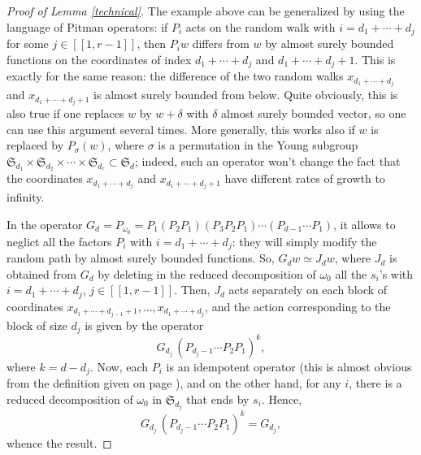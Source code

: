 \documentclass[smallextended,nospthms]{svjour3}
\theoremstyle{remark}
\newcommand{\sym}{\mathfrak{S}}
\newcommand{\lle}{\left[\!\left[}
\newcommand{\rre}{\right]\!\right]}
\begin{document}
\begin{proof}[Proof of Lemma \ref{technical}]
The example above can be generalized by using the language of Pitman operators: if $P_{i}$ acts on the random walk with $i=d_{1}+\cdots+d_{j}$ for some $j \in \lle 1,r-1\rre$, then $P_{i}w$ differs from $w$ by almost surely bounded functions on the coordinates of index $d_{1}+\cdots+d_{j}$ and $d_{1}+\cdots+d_{j}+1$. This is exactly for the same reason: the difference of the two random walks $x_{d_{1}+\cdots+d_{j}}$ and $x_{d_{1}+\cdots+d_{j}+1}$ is almost surely bounded from below. Quite obviously, this is also true if one replaces $w$ by $w+\delta$ with $\delta$ almost surely bounded vector, so one can use this argument several times. More generally, this works also if $w$ is replaced by $P_{\sigma}(w)$, where $\sigma$ is a permutation in the Young subgroup $\sym_{d_{1}}\times \sym_{d_{2}}\times \cdots \times \sym_{d_{r}} \subset \sym_{d}$; indeed, such an operator won't change the fact that the coordinates $x_{d_{1}+\cdots+d_{j}}$ and $x_{d_{1}+\cdots+d_{j}+1}$ have different rates of growth to infinity. \bigskip

In the operator $G_{d}=P_{\omega_{0}}=P_{1}(P_{2}P_{1})(P_{3}P_{2}P_{1})\cdots(P_{d-1}\cdots P_{1})$, it allows to neglict all the factors $P_{i}$ with $i=d_{1}+\cdots+d_{j}$: they will simply modify the random path by almost surely bounded functions. So, $G_{d}w\simeq J_{d}w$, where $J_{d}$ is obtained from $G_{d}$ by deleting in the reduced decomposition of $\omega_{0}$ all the $s_{i}$'s with $i=d_{1}+\cdots+d_{j}$, $j \in \lle 1,r-1\rre$. Then, $J_{d}$ acts separately on each block of coordinates $x_{d_{1}+\cdots+d_{j-1}+1},\ldots,x_{d_{1}+\cdots+d_{j}}$, and the action corresponding to the block of size $d_{j}$ is given by the operator
$$G_{d_{j}}\,(P_{d_{j}-1}\cdots P_{2}P_{1})^{k},$$
where $k=d-d_{j}$. Now, each $P_{i}$ is an idempotent operator (this is almost obvious from the definition given on page \pageref{pitmanoperator}), and on the other hand, for any $i$, there is a reduced decomposition of $\omega_{0}$ in $\sym_{d_{j}}$ that ends by $s_{i}$. Hence, 
$$G_{d_{j}}\,(P_{d_{j}-1}\cdots P_{2}P_{1})^{k}=G_{d_{j}},$$
whence the result.
\end{proof}
\bigskip
\bigskip
\end{document}
